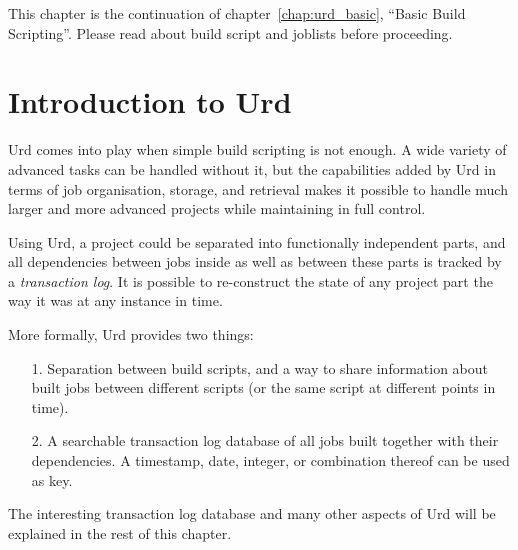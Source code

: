
\label{chap:urd}

This chapter is the continuation of chapter~\ref{chap:urd_basic},
``Basic Build Scripting''.  Please read about build script and
joblists before proceeding.


\section{Introduction to Urd}

Urd comes into play when simple build scripting is not enough.  A wide
variety of advanced tasks can be handled without it, but the
capabilities added by Urd in terms of job organisation, storage, and
retrieval makes it possible to handle much larger and more advanced
projects while maintaining in full control.

Using Urd, a project could be separated into functionally independent
parts, and all dependencies between jobs inside as well as between
these parts is tracked by a \textsl{transaction log}.  It is possible
to re-construct the state of any project part the way it was at any
instance in time.

More formally, Urd provides two things:
\begin{itemize}
\item[1.] Separation between build scripts,
        and a way to share information about built jobs between
        different scripts (or the same script at different points in
        time).
\item[2.] A searchable transaction log database of all jobs built
          together with their dependencies.  A timestamp, date,
          integer, or combination thereof can be used as key.
\end{itemize}
The interesting transaction log database and many other aspects of Urd
will be explained in the rest of this chapter.



